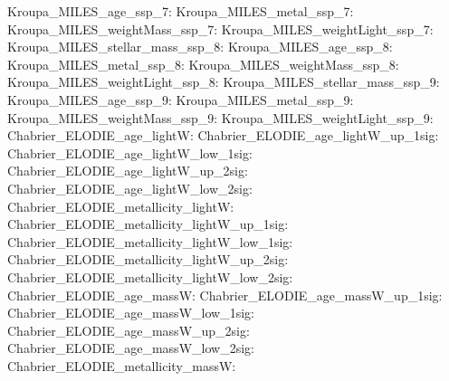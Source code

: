 Kroupa\_MILES\_age\_ssp\_7:  \newline 
Kroupa\_MILES\_metal\_ssp\_7:  \newline 
Kroupa\_MILES\_weightMass\_ssp\_7:  \newline 
Kroupa\_MILES\_weightLight\_ssp\_7:  \newline 
Kroupa\_MILES\_stellar\_mass\_ssp\_8:  \newline 
Kroupa\_MILES\_age\_ssp\_8:  \newline 
Kroupa\_MILES\_metal\_ssp\_8:  \newline 
Kroupa\_MILES\_weightMass\_ssp\_8:  \newline 
Kroupa\_MILES\_weightLight\_ssp\_8:  \newline 
Kroupa\_MILES\_stellar\_mass\_ssp\_9:  \newline 
Kroupa\_MILES\_age\_ssp\_9:  \newline 
Kroupa\_MILES\_metal\_ssp\_9:  \newline 
Kroupa\_MILES\_weightMass\_ssp\_9:  \newline 
Kroupa\_MILES\_weightLight\_ssp\_9:  \newline 
Chabrier\_ELODIE\_age\_lightW:  \newline 
Chabrier\_ELODIE\_age\_lightW\_up\_1sig:  \newline 
Chabrier\_ELODIE\_age\_lightW\_low\_1sig:  \newline 
Chabrier\_ELODIE\_age\_lightW\_up\_2sig:  \newline 
Chabrier\_ELODIE\_age\_lightW\_low\_2sig:  \newline 
Chabrier\_ELODIE\_metallicity\_lightW:  \newline 
Chabrier\_ELODIE\_metallicity\_lightW\_up\_1sig:  \newline 
Chabrier\_ELODIE\_metallicity\_lightW\_low\_1sig:  \newline 
Chabrier\_ELODIE\_metallicity\_lightW\_up\_2sig:  \newline 
Chabrier\_ELODIE\_metallicity\_lightW\_low\_2sig:  \newline 
Chabrier\_ELODIE\_age\_massW:  \newline 
Chabrier\_ELODIE\_age\_massW\_up\_1sig:  \newline 
Chabrier\_ELODIE\_age\_massW\_low\_1sig:  \newline 
Chabrier\_ELODIE\_age\_massW\_up\_2sig:  \newline 
Chabrier\_ELODIE\_age\_massW\_low\_2sig:  \newline 
Chabrier\_ELODIE\_metallicity\_massW:  \newline 
